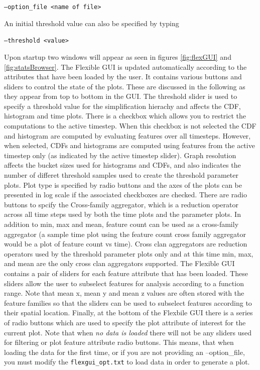 \texttt{--option\_file <name of file> }

An initial threshold value can also be specified by typing 

\texttt{--threshold <value> }

Upon startup two windows will appear as seen in figures \ref{fig:flexGUI} and \ref{fig:statsBrowser}. The Flexible GUI 
is updated automatically according to the attributes that have been loaded by the user.
It contains various buttons and sliders to control the state of the plots.  These are discussed in the
following as they appear from top to bottom in the GUI.  The threshold slider is used to specify 
a threshold value for the simplification hierachy and affects the CDF, histogram and time plots.  
There is a checkbox which allows you to restrict the computations to the active timestep.
When this checkbox is not selected the CDF and histogram are computed by evaluating features
over all timesteps.  However, when selected, CDFs and histograms are computed using features from
the active timestep only (as indicated by the active timestep slider). Graph resolution
affects the bucket sizes used for histograms and CDFs, and also indicates the number
of differet threshold samples used to create the threshold parameter plots.
Plot type is specified by radio buttons and the axes of the plots can be presented in log scale
if the associated checkboxes are checked.  There are radio buttons to spcify the Cross-family 
aggregator, which is a reduction operator across all time steps used by both the time plots and the 
parameter plots.  In addition to min, max and mean, feature count can be used as a cross-family
aggregator (a sample time plot using the feature count cross family aggregator would be a plot
of feature count vs time).  Cross clan aggregators are reduction
operators used by the threshold parameter plots only and at this time min, max, and mean are the 
only cross clan aggregators supported. The Flexible GUI contains a pair of sliders
for each feature attribute that has been loaded.  These sliders allow the user to subselect features
for analysis according to a function range.  Note that mean x, mean y and mean z values are often
stored with the feature families so that the sliders can be used to subselect features according to
their spatial location.   Finally, at the bottom of the Flexbile GUI there is a series of radio buttons
which are used to specify the plot attribute of interest for the current plot.  Note that when \emph{no
data is loaded} there will not be any sliders used for filtering or plot feature attribute radio buttons.
This means, that when loading the data for the first time, or if you are not providing an
--option\_file, you must modify the \texttt{flexgui\_opt.txt} to load data in order to generate a plot.

